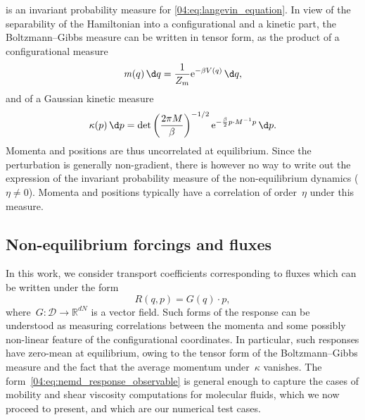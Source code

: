 is an invariant probability measure for \eqref{04:eq:langevin_equation}.
In view of the separability of the Hamiltonian into a configurational and a kinetic part, the Boltzmann--Gibbs measure can be written in tensor form, as the product of a configurational measure
\[\mathit{m}(q)\,\d q = \frac1{Z_m}\mathrm{e}^{-\beta V(q)}\,\d q,\]
and of a Gaussian kinetic measure
\[\kappa(p)\,\d p  = \operatorname{det}\left(\frac{2\pi M}\beta\right)^{-1/2}\mathrm{e}^{-\frac\beta2 p\cdot M^{-1}p}\,\d p.\]
Momenta and positions are thus uncorrelated at equilibrium.
Since the perturbation is generally non-gradient, there is however no way to write out the expression of the invariant probability measure of the non-equilibrium dynamics ($\eta\neq 0$). Momenta and positions typically have a correlation of order~$\eta$ under this measure.

\subsection{Non-equilibrium forcings and fluxes}
\label{04:subsec:langevin_tc}
In this work, we consider transport coefficients corresponding to fluxes which can be written under the form
\begin{equation}
    \label{04:eq:nemd_response_observable}
    R(q,p)=G(q)\cdot p,
\end{equation}
where~$G: \mathcal D \to \mathbb{R}^{dN}$ is a vector field. 
Such forms of the response can be understood as measuring correlations between the momenta and some possibly non-linear feature of the configurational coordinates. In particular, such responses have zero-mean at equilibrium, owing to the tensor form of the Boltzmann--Gibbs measure and the fact that the average momentum under~$\kappa$ vanishes. The form~\eqref{04:eq:nemd_response_observable} is general enough to capture the cases of mobility and shear viscosity computations for molecular fluids, which we now proceed to present, and which are our numerical test cases.

